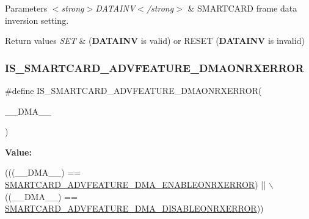 \begin{DoxyParams}{Parameters}
{\em $<$strong$>$\+D\+A\+T\+A\+I\+N\+V$<$/strong$>$} & S\+M\+A\+R\+T\+C\+A\+RD frame data inversion setting. \\
\hline
\end{DoxyParams}

\begin{DoxyRetVals}{Return values}
{\em S\+ET} & ({\bfseries D\+A\+T\+A\+I\+NV} is valid) or R\+E\+S\+ET ({\bfseries D\+A\+T\+A\+I\+NV} is invalid) \\
\hline
\end{DoxyRetVals}
\mbox{\label{group___s_m_a_r_t_c_a_r_d___private___macros_ga68caa23cdb6592178ed44b60ca5e6493}} 
\subsubsection{\texorpdfstring{I\+S\+\_\+\+S\+M\+A\+R\+T\+C\+A\+R\+D\+\_\+\+A\+D\+V\+F\+E\+A\+T\+U\+R\+E\+\_\+\+D\+M\+A\+O\+N\+R\+X\+E\+R\+R\+OR}{IS\_SMARTCARD\_ADVFEATURE\_DMAONRXERROR}}
{\footnotesize\ttfamily \#define I\+S\+\_\+\+S\+M\+A\+R\+T\+C\+A\+R\+D\+\_\+\+A\+D\+V\+F\+E\+A\+T\+U\+R\+E\+\_\+\+D\+M\+A\+O\+N\+R\+X\+E\+R\+R\+OR(\begin{DoxyParamCaption}\item[{}]{\+\_\+\+\_\+\+D\+M\+A\+\_\+\+\_\+ }\end{DoxyParamCaption})}

{\bfseries Value\+:}
\begin{DoxyCode}
(((\_\_DMA\_\_) == \hyperlink{group___s_m_a_r_t_c_a_r_d___d_m_a___disable__on___rx___error_ga2555ba29367e06ac37ba57848df8334b}{SMARTCARD\_ADVFEATURE\_DMA\_ENABLEONRXERROR}) || \(\backslash\)
                                                       ((\_\_DMA\_\_) == 
      \hyperlink{group___s_m_a_r_t_c_a_r_d___d_m_a___disable__on___rx___error_ga210daec9e693a3d2f347ad9ed8f9f782}{SMARTCARD\_ADVFEATURE\_DMA\_DISABLEONRXERROR}))
\end{DoxyCode}


